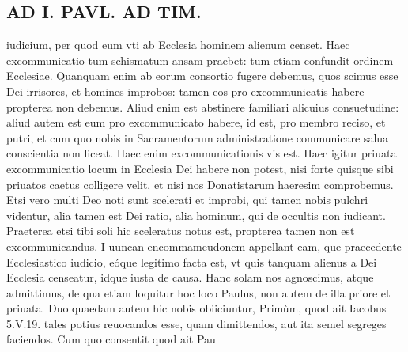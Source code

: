 \documentclass{article}
\begin{document}
\begin{pages}
\section*{AD I. PAVL. AD TIM. }
\marginpar{[ p.432 ]}\pstart iudicium, per quod eum vti ab Ecclesia hominem alienum censet. Haec excommunicatio tum schismatum ansam praebet: tum etiam confundit ordinem Ecclesiae. Quanquam enim ab eorum consortio fugere debemus, quos scimus esse Dei irrisores, et homines improbos: tamen eos pro excommunicatis habere propterea non debemus. Aliud enim est abstinere familiari alicuius consuetudine: aliud autem est eum pro excommunicato habere, id est, pro membro reciso, et putri, et cum quo nobis in Sacramentorum administratione communicare salua conscientia non liceat. Haec enim excommunicationis vis est. Haec igitur priuata excommunicatio locum in Ecclesia Dei habere non potest, nisi forte quisque sibi priuatos caetus colligere velit, et nisi nos Donatistarum haeresim comprobemus. Etsi vero multi Deo noti sunt scelerati et improbi, qui tamen nobis pulchri videntur, alia tamen est Dei ratio, alia hominum, qui de occultis non iudicant. Praeterea etsi tibi soli hic sceleratus notus est, propterea tamen non est excommunicandus.  \pend\pstart I uuncan encommameudonem appellant eam, que praecedente Ecclesiastico iudicio, eóque legitimo facta est, vt quis tanquam alienus a Dei Ecclesia censeatur, idque iusta de causa. Hanc solam nos agnoscimus, atque admittimus, de qua etiam loquitur hoc loco Paulus, non autem de illa priore et priuata.  \pend\pstart Duo quaedam autem hic nobis obiiciuntur, Primùm, quod ait Iacobus 5.V.19. tales potius reuocandos esse, quam dimittendos, aut ita semel segreges faciendos. Cum quo consentit quod ait Pau\pend

\end{pages}
\end{document}
